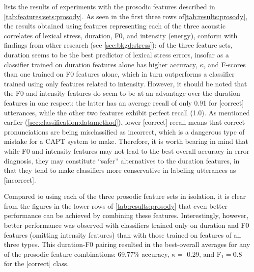 		 lists the results of experiments with the prosodic features described in \cref{tab:features:sets:prosody}. As seen in the first three rows of\cref{tab:results:prosody}, the results obtained using features representing each of the three acoustic correlates of lexical stress, duration, F0, and intensity (energy), 
		conform with findings from other research 
		(see \cref{sec:bkgd:stress}): of the three feature sets, duration seems to be the best predictor of lexical stress errors, insofar as a classifier trained on duration features alone has higher accuracy, $\kappa$, and F-scores than one trained on F0 features alone, which in turn outperforms a classifier trained using only features related to intensity. However, it should be noted that the F0 and intensity features do seem to be at an advantage over the duration features in one respect: the latter has an average recall of only 0.91 for [correct] utterances, while the other two features exhibit perfect recall (1.0). As mentioned earlier (\cref{sec:classification:datamethod}), lower [correct] recall means that correct pronunciations are being misclassified as incorrect, which is a dangerous type of mistake for a CAPT system to make. Therefore, it is worth bearing in mind that while F0 and intensity features may not lead to the best overall accuracy in error diagnosis, they may constitute ``safer'' alternatives to the duration features, in that they tend to make classifiers more conservative in labeling utterances as [incorrect]. 
		
		Compared to using each of the three prosodic feature sets in isolation, it is clear from the figures in the lower rows of \cref{tab:results:prosody} that even better performance can be achieved by combining these features. Interestingly, however, 
		better performance was observed with classifiers trained only on duration and F0 features (omitting intensity features) than with those trained on features of all three types.
		This duration-F0 pairing resulted in the best-overall averages for any of the prosodic feature combinations: 69.77\% accuracy, $\kappa = $ 0.29, and F$_1 = 0.8$ for the [correct] class.
		
		
		
